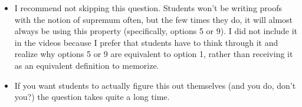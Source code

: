 \documentclass[11pt]{article}
\newcommand{\nl}{\hfill \vspace{-1.1\baselineskip}} %
\begin{document}
\begin{warning}
\nl
	\begin{itemize}
		\item I recommend not skipping this question.  Students won't be writing proofs with the notion of supremum often, but the few times they do, it will almost always be using this property (specifically, options 5 or 9).  I did not include it in the videos because I prefer that students have to think through it and realize why options 5 or 9 are equivalent to option 1, rather than receiving it as an equivalent definition to memorize.
		\item If you want students to actually figure this out themselves (and you do, don't you?) the question takes quite a long time.
	\end{itemize}	
\end{warning}
\end{document}

